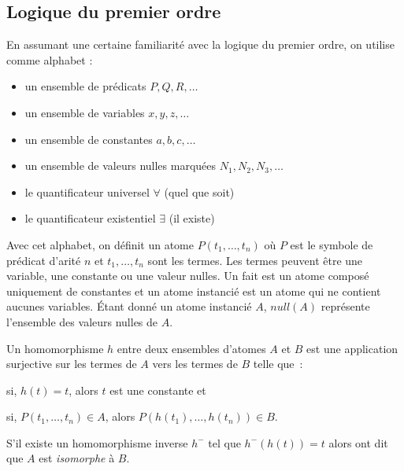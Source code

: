 \subsection{Logique du premier ordre}

En assumant une certaine familiarité avec la logique du premier ordre, on utilise comme alphabet :
\begin{itemize}
    \item un ensemble de prédicats $P, Q, R, \dots$
    \item un ensemble de variables $x, y, z, \dots$
    \item un ensemble de constantes $a, b, c, \dots$
    \item un ensemble de valeurs nulles marquées $N_1, N_2, N_3, \dots$
    \item le quantificateur universel $\forall$ (quel que soit)
    \item le quantificateur existentiel $\exists$ (il existe)
\end{itemize}
Avec cet alphabet, on définit un atome $P(t_1, \dots, t_n)$ où $P$ est le symbole de prédicat d'arité $n$ et $t_1, \dots, t_n$ sont les termes.
Les termes peuvent être une variable, une constante ou une valeur nulles.
Un fait est un atome composé uniquement de constantes et un atome instancié est un atome qui ne contient aucunes variables.
Étant donné un atome instancié $A$, $null(A)$ représente l'ensemble des valeurs nulles de $A$.

Un homomorphisme $h$ entre deux ensembles d'atomes $A$ et $B$ est une application surjective sur les termes de $A$ vers les termes de $B$ telle que :
\begin{enumerate*}[label=(\roman*)]
    \item si, $h(t) = t$, alors $t$ est une constante et
    \item si, $P(t_1, \dots, t_n) \in A$, alors $P(h(t_1), \dots, h(t_n)) \in B$.
\end{enumerate*}
S'il existe un homomorphisme inverse $h^-$ tel que $h^-(h(t)) = t$ alors ont dit que $A$ est \textit{isomorphe} à $B$.

